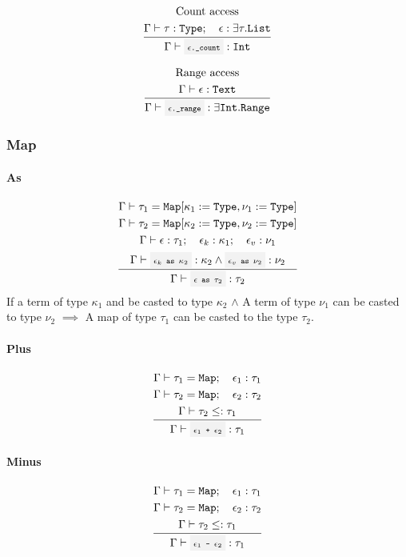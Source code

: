 \[
	\infrule{
		\text{Count access}\\*
		\EnvSym\then \tau:\Type \semiq \expr:\exists\tau.\List
	}{
		\EnvSym\then \code{$\expr$.\_count}: \Int
	}
\]

\[
	\infrule{
		\text{Range access}\\*
		\EnvSym\then \expr:\Text
	}{
		\EnvSym\then \code{$\expr$.\_range}: \exists\Int.\Range
	}
\]

\subsubsection{Map}

\paragraph{As}

\[
	\infrule{
		\EnvSym\then \tau_1 = \Map[\kappa_1:=\Type,\nu_1:=\Type] \\*
		\EnvSym\then \tau_2 = \Map[\kappa_2:=\Type,\nu_2:=\Type] \\*
		\EnvSym\then \expr:\tau_1 \semiq \expr_k:\kappa_1 \semiq \expr_v:\nu_1 \\*
		\EnvSym\then \code{$\expr_k$ as $\kappa_2$} : \kappa_2 \land \code{$\expr_v$ as $\nu_2$} : \nu_2
	}{
		\EnvSym\then \code{$\expr$ as $\tau_2$} : \tau_2
	}
\]
If a term of type $\kappa_1$ and be casted to type $\kappa_2$ $\land$ A term of
type $\nu_1$ can be casted to type $\nu_2$ $\implies$ A map of type $\tau_1$
can be casted to the type $\tau_2$.

\paragraph{Plus}

\[
	\infrule{
		\EnvSym\then \tau_1=\Map \semiq \expr_1:\tau_1 \\*
		\EnvSym\then \tau_2=\Map \semiq \expr_2:\tau_2 \\*
		\EnvSym\then \tau_2 \narreq \tau_1
	}{
		\EnvSym\then \code{$\expr_1$ + $\expr_2$} : \tau_1
	}
\]

\paragraph{Minus}

\[
	\infrule{
		\EnvSym\then \tau_1=\Map \semiq \expr_1:\tau_1 \\*
		\EnvSym\then \tau_2=\Map \semiq \expr_2:\tau_2 \\*
		\EnvSym\then \tau_2 \narreq \tau_1
	}{
		\EnvSym\then \code{$\expr_1$ - $\expr_2$} : \tau_1
	}
\]


